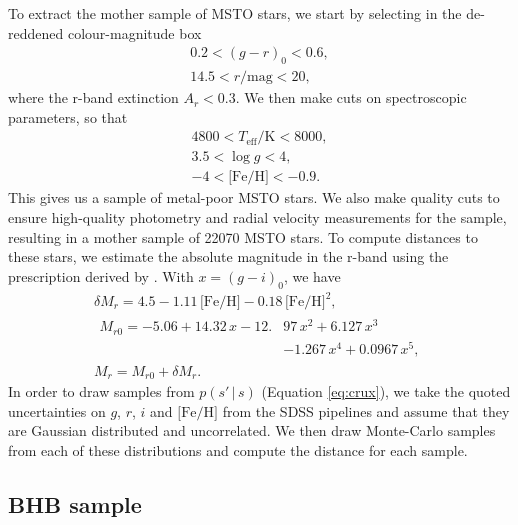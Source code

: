 \documentclass[useAMS,twocolumn,usenatbib]{mn2e}
\begin{document}
To extract the mother sample of MSTO stars, we start by selecting in the de-reddened 
colour-magnitude box
%
\begin{gather}
0.2 < (g-r)_0 < 0.6, \nonumber \\
14.5 < r/\mathrm{mag} < 20,
\end{gather}
%
where the r-band extinction $A_r<0.3$. We then 
make cuts on spectroscopic parameters, so that
%
\begin{gather}
4800 < T_{\mathrm{eff}}/\mathrm{K} < 8000, \nonumber \\
3.5 < \log g < 4, \nonumber \\
-4 < \mathrm{\lbrack Fe/H \rbrack} < -0.9.
\end{gather}
% 
This gives us a sample of metal-poor MSTO stars. We also 
make quality cuts to ensure high-quality photometry and radial velocity 
measurements for the sample, resulting in a mother sample of 
22070 MSTO stars. To compute distances to these 
stars, we estimate the absolute magnitude in the r-band using the prescription 
derived by \cite{Iv08}. With $x=(g-i)_0$, we have
%
\begin{gather}
\delta M_r = 4.5 - 1.11\,\lbrack \mathrm{Fe/H} \rbrack -0.18\,\lbrack \mathrm{Fe/H} \rbrack^2, \nonumber \\
\begin{split}
M_{r0} = -5.06 + 14.32\,x - 12.{}&97\,x^2 + 6.127\,x^3 \nonumber \\
                    {}&- 1.267\,x^4 + 0.0967\,x^5,
\end{split}\\
M_r = M_{r0} + \delta M_r.
\end{gather}
% 
In order to draw samples from $p(s' \,|\, s)$ (Equation \ref{eq:crux}), we take the quoted 
uncertainties on $g$, $r$, $i$ and $\lbrack \mathrm{Fe/H} \rbrack$ from the SDSS pipelines 
and assume that they are Gaussian distributed and uncorrelated. We then draw Monte-Carlo 
samples from each of these distributions and compute the distance for each sample.

\subsection{BHB sample}
\end{document}
